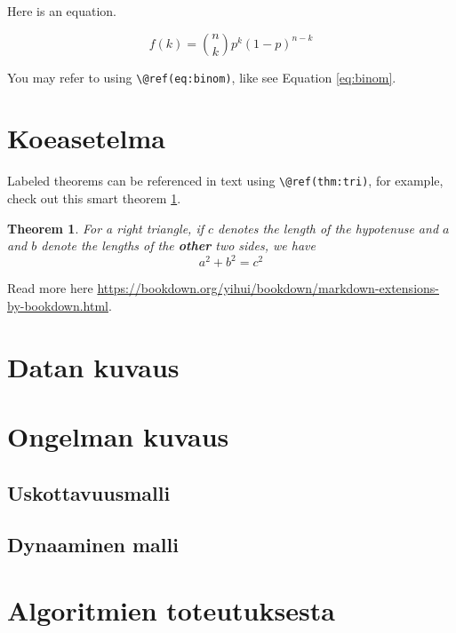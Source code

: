 \documentclass[
  12pt,
  a4paper, twoside]{book}
\newtheorem{theorem}{Theorem}[chapter]
\theoremstyle{definition}
\theoremstyle{definition}
\theoremstyle{definition}
\theoremstyle{definition}
\theoremstyle{remark}
\begin{document}
Here is an equation.

\begin{equation} 
  f\left(k\right) = \binom{n}{k} p^k\left(1-p\right)^{n-k}
  \label{eq:binom}
\end{equation}

You may refer to using \texttt{\textbackslash{}@ref(eq:binom)}, like see Equation \eqref{eq:binom}.

\hypertarget{koeasetelma}{%
\section{Koeasetelma}\label{koeasetelma}}

Labeled theorems can be referenced in text using \texttt{\textbackslash{}@ref(thm:tri)}, for example, check out this smart theorem \ref{thm:tri}.

\begin{theorem}
\protect\hypertarget{thm:tri}{}\label{thm:tri}For a right triangle, if \(c\) denotes the \emph{length} of the hypotenuse
and \(a\) and \(b\) denote the lengths of the \textbf{other} two sides, we have
\[a^2 + b^2 = c^2\]
\end{theorem}

Read more here \url{https://bookdown.org/yihui/bookdown/markdown-extensions-by-bookdown.html}.

\hypertarget{datan-kuvaus}{%
\section{Datan kuvaus}\label{datan-kuvaus}}

\hypertarget{ongelman-kuvaus}{%
\section{Ongelman kuvaus}\label{ongelman-kuvaus}}

\hypertarget{uskottavuusmalli}{%
\subsection{Uskottavuusmalli}\label{uskottavuusmalli}}

\hypertarget{dynaaminen-malli}{%
\subsection{Dynaaminen malli}\label{dynaaminen-malli}}

\hypertarget{algoritmien-toteutuksesta}{%
\section{Algoritmien toteutuksesta}\label{algoritmien-toteutuksesta}}
\end{document}
